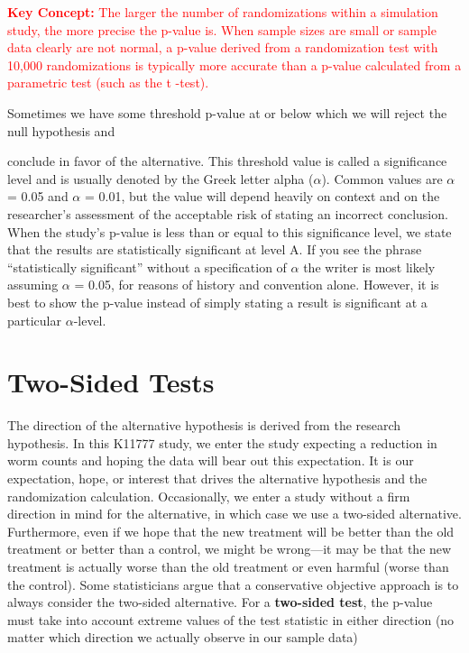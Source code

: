\documentclass[
]{report}
\theoremstyle{definition}
\theoremstyle{definition}
\theoremstyle{definition}
\theoremstyle{definition}
\theoremstyle{remark}
\begin{document}
\Large

\textbf{\textcolor{red}{Key Concept:}}
\textcolor{red}{The larger the number of randomizations within a simulation study, the more precise the p-value is.
When sample sizes are small or sample data clearly are not normal, a p-value derived from a randomization
test with 10,000 randomizations is typically more accurate than a p-value calculated from
a parametric test (such as the t -test).}

\normalsize

Sometimes we have some threshold p-value at or below which we will reject the null hypothesis and

conclude in favor of the alternative. This threshold value is called a significance level and is usually denoted
by the Greek letter alpha (\(\alpha\)). Common values are \(\alpha\) = 0.05 and \(\alpha\) = 0.01, but the value will depend heavily
on context and on the researcher's assessment of the acceptable risk of stating an incorrect conclusion. When
the study's p-value is less than or equal to this significance level, we state that the results are statistically
significant at level A. If you see the phrase ``statistically significant'' without a specification of \(\alpha\) the writer
is most likely assuming \(\alpha\) = 0.05, for reasons of history and convention alone. However, it is best to show
the p-value instead of simply stating a result is significant at a particular \(\alpha\)-level.

\hypertarget{two-sided-tests}{%
\section{\texorpdfstring{\textbf{Two-Sided Tests}}{Two-Sided Tests}}\label{two-sided-tests}}

The direction of the alternative hypothesis is derived from the research hypothesis. In this K11777 study, we
enter the study expecting a reduction in worm counts and hoping the data will bear out this expectation. It is
our expectation, hope, or interest that drives the alternative hypothesis and the randomization calculation. Occasionally,
we enter a study without a firm direction in mind for the alternative, in which case we use a two-sided
alternative. Furthermore, even if we hope that the new treatment will be better than the old treatment or better
than a control, we might be wrong---it may be that the new treatment is actually worse than the old treatment
or even harmful (worse than the control). Some statisticians argue that a conservative objective approach is to
always consider the two-sided alternative. For a \textbf{two-sided test}, the p-value must take into account extreme
values of the test statistic in either direction (no matter which direction we actually observe in our sample data)
\end{document}
